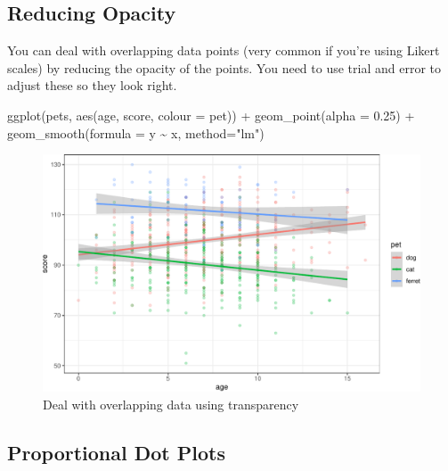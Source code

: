 \documentclass[
  oneside]{book}
\newenvironment{Shaded}{\begin{snugshade}}{\end{snugshade}}
\newcommand{\AttributeTok}[1]{\textcolor[rgb]{0.77,0.63,0.00}{#1}}
\newcommand{\FloatTok}[1]{\textcolor[rgb]{0.00,0.00,0.81}{#1}}
\newcommand{\FunctionTok}[1]{\textcolor[rgb]{0.00,0.00,0.00}{#1}}
\newcommand{\NormalTok}[1]{#1}
\newcommand{\SpecialCharTok}[1]{\textcolor[rgb]{0.00,0.00,0.00}{#1}}
\newcommand{\StringTok}[1]{\textcolor[rgb]{0.31,0.60,0.02}{#1}}
\begin{document}
\hypertarget{reducing-opacity}{%
\subsection{Reducing Opacity}\label{reducing-opacity}}

You can deal with overlapping data points (very common if you're using Likert scales) by reducing the opacity of the points. You need to use trial and error to adjust these so they look right.

\begin{Shaded}
\begin{Highlighting}[]
\FunctionTok{ggplot}\NormalTok{(pets, }\FunctionTok{aes}\NormalTok{(age, score, }\AttributeTok{colour =}\NormalTok{ pet)) }\SpecialCharTok{+}
  \FunctionTok{geom\_point}\NormalTok{(}\AttributeTok{alpha =} \FloatTok{0.25}\NormalTok{) }\SpecialCharTok{+}
  \FunctionTok{geom\_smooth}\NormalTok{(}\AttributeTok{formula =}\NormalTok{ y }\SpecialCharTok{\textasciitilde{}}\NormalTok{ x, }\AttributeTok{method=}\StringTok{"lm"}\NormalTok{)}
\end{Highlighting}
\end{Shaded}

\begin{figure}

{\centering \includegraphics[width=0.9\linewidth]{images/overlap-alpha-1} 

}

\caption{Deal with overlapping data using transparency}\label{fig:overlap-alpha}
\end{figure}

\hypertarget{geom_count}{%
\subsection{Proportional Dot Plots}\label{geom_count}}
\end{document}
